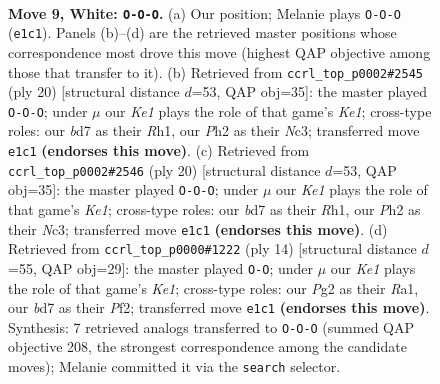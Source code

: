 \documentclass[11pt]{article}
\begin{document}
\clearpage

\begin{figure}[p]\centering
\begin{subfigure}{0.46\textwidth}\centering
\resizebox{\linewidth}{!}{%
\newchessgame
\chessboard[
  setfen={rn1qk2r/pp1bppbp/3p2p1/7n/3NP3/2N1BP2/PPPQ2PP/R3KB1R w KQkq - 3 9},
  showmover=false,
  pgfstyle=straightmove, color=movearrow, markmove={e1-c1}
]}
\caption{}
\end{subfigure}\hfill
\begin{subfigure}{0.46\textwidth}\centering
\resizebox{\linewidth}{!}{%
\newchessgame
\chessboard[
  setfen={r2qk2r/pp1bppbn/2np2p1/6Pp/3NP3/2N1BP2/PPPQ3P/R3KB1R w KQkq - 1 11},
  showmover=false,
  pgfstyle=straightmove, color=movearrow, markmove={e1-c1}
]}
\caption{}
\end{subfigure}
\\[4pt]
\begin{subfigure}{0.46\textwidth}\centering
\resizebox{\linewidth}{!}{%
\newchessgame
\chessboard[
  setfen={r2qk2r/pp1bppbn/2np2p1/6Pp/3NP3/2N1BP2/PPPQ3P/R3KB1R w KQkq - 1 11},
  showmover=false,
  pgfstyle=straightmove, color=movearrow, markmove={e1-c1}
]}
\caption{}
\end{subfigure}\hfill
\begin{subfigure}{0.46\textwidth}\centering
\resizebox{\linewidth}{!}{%
\newchessgame
\chessboard[
  setfen={r2qkbnr/pp1n1ppp/2p1p1b1/8/3P4/3B1NN1/PPP2PPP/R1BQK2R w KQkq - 0 8},
  showmover=false,
  pgfstyle=straightmove, color=movearrow, markmove={e1-g1}
]}
\caption{}
\end{subfigure}
\caption{\textbf{Move 9, White: \texttt{O-O-O}.} (a) Our position; Melanie plays \texttt{O-O-O} (\texttt{e1c1}). Panels (b)--(d) are the retrieved master positions whose correspondence most drove this move (highest QAP objective among those that transfer to it). (b) Retrieved from \texttt{ccrl\_top\_p0002\#2545} (ply 20) [structural distance $d$=53, QAP obj=35]: the master played \texttt{O-O-O}; under $\mu$ our \emph{Ke1} plays the role of that game's \emph{Ke1}; cross-type roles: our \emph{b}d7 as their \emph{R}h1, our \emph{P}h2 as their \emph{N}c3; transferred move \texttt{e1c1} \textbf{(endorses this move)}. (c) Retrieved from \texttt{ccrl\_top\_p0002\#2546} (ply 20) [structural distance $d$=53, QAP obj=35]: the master played \texttt{O-O-O}; under $\mu$ our \emph{Ke1} plays the role of that game's \emph{Ke1}; cross-type roles: our \emph{b}d7 as their \emph{R}h1, our \emph{P}h2 as their \emph{N}c3; transferred move \texttt{e1c1} \textbf{(endorses this move)}. (d) Retrieved from \texttt{ccrl\_top\_p0000\#1222} (ply 14) [structural distance $d$=55, QAP obj=29]: the master played \texttt{O-O}; under $\mu$ our \emph{Ke1} plays the role of that game's \emph{Ke1}; cross-type roles: our \emph{P}g2 as their \emph{R}a1, our \emph{b}d7 as their \emph{P}f2; transferred move \texttt{e1c1} \textbf{(endorses this move)}. Synthesis: 7 retrieved analogs transferred to \texttt{O-O-O} (summed QAP objective 208, the strongest correspondence among the candidate moves); Melanie committed it via the \texttt{search} selector.}
\label{fig:thought-m16}
\end{figure}
\end{document}
